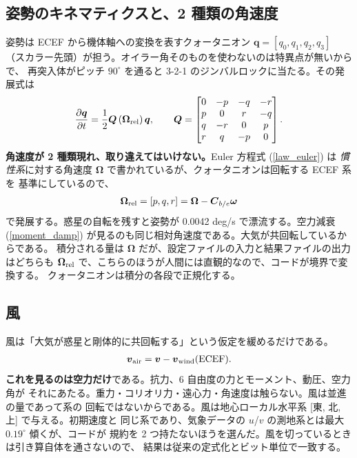 \documentclass[11pt,a4paper,dvipdfmx]{jsarticle}
\newcommand{\bv}{{\boldsymbol v}}
\newcommand{\bq}{{\boldsymbol q}}
\newcommand{\bOm}{{\boldsymbol \Omega}}
\newcommand{\bom}{{\boldsymbol \omega}}
\newcommand{\bC}{{\boldsymbol C}}
\begin{document}
\subsection{姿勢のキネマティクスと、2 種類の角速度}

姿勢は ECEF から機体軸への変換を表すクォータニオン $\bq = [q_0, q_1, q_2, q_3]$
（スカラー先頭）が担う。オイラー角そのものを使わないのは特異点が無いからで、
再突入体がピッチ $90^\circ$ を通ると 3-2-1 のジンバルロックに当たる。その発展式は
%
\begin{align}
	\frac{ \partial \bq }{ \partial t } = \frac{1}{2} {\boldsymbol Q} \left( \bOm_{\rm rel} \right) \bq ,
	\qquad
	{\boldsymbol Q} = \begin{bmatrix}
	0 & -p & -q & -r \\
	p & 0 & r & -q \\
	q & -r & 0 & p \\
	r & q & -p & 0 \end{bmatrix} .
\end{align}
%
\textbf{角速度が 2 種類現れ、取り違えてはいけない。}Euler 方程式 (\ref{law_euler}) は
\emph{慣性系}に対する角速度 $\bOm$ で書かれているが、クォータニオンは回転する ECEF 系を
基準にしているので、
%
\begin{align}
	\bOm_{\rm rel} = \left[ p, q, r \right] = \bOm - \bC_{b/e} \bom
\end{align}
%
で発展する。惑星の自転を残すと姿勢が 0.0042 deg/s で漂流する。空力減衰
(\ref{moment_damp}) が見るのも同じ相対角速度である。大気が共回転しているからである。
積分される量は $\bOm$ だが、設定ファイルの入力と結果ファイルの出力はどちらも
$\bOm_{\rm rel}$ で、こちらのほうが人間には直観的なので、コードが境界で変換する。
クォータニオンは積分の各段で正規化する。

\subsection{風}

風は「大気が惑星と剛体的に共回転する」という仮定を緩めるだけである。
%
\begin{align}
	\bv_{\rm air} = \bv - \bv_{\rm wind} ({\rm ECEF}) .
\end{align}
%
\textbf{これを見るのは空力だけ}である。抗力、6 自由度の力とモーメント、動圧、空力角が
それにあたる。重力・コリオリ力・遠心力・角速度は触らない。風は並進の量であって系の
回転ではないからである。風は地心ローカル水平系 [東, 北, 上] で与える。初期速度と
同じ系であり、気象データの $u$/$v$ の測地系とは最大 $0.19^\circ$ 傾くが、コードが
規約を 2 つ持たないほうを選んだ。風を切っているときは引き算自体を通さないので、
結果は従来の定式化とビット単位で一致する。
\end{document}
